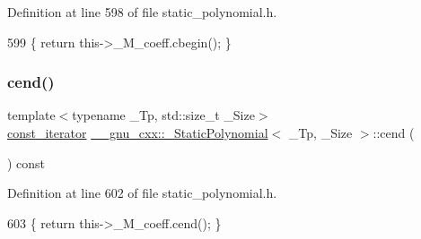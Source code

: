 Definition at line 598 of file static\+\_\+polynomial.\+h.


\begin{DoxyCode}
599       \{ \textcolor{keywordflow}{return} this->\_M\_coeff.cbegin(); \}
\end{DoxyCode}
\mbox{\label{class____gnu__cxx_1_1__StaticPolynomial_aa3cf8c243eaa80347ae1ba02897344e9}} 
\subsubsection{\texorpdfstring{cend()}{cend()}}
{\footnotesize\ttfamily template$<$typename \+\_\+\+Tp, std\+::size\+\_\+t \+\_\+\+Size$>$ \\
\hyperlink{class____gnu__cxx_1_1__StaticPolynomial_a2e806a3a61788a2fad49adf67725ae7e}{const\+\_\+iterator} \hyperlink{class____gnu__cxx_1_1__StaticPolynomial}{\+\_\+\+\_\+gnu\+\_\+cxx\+::\+\_\+\+Static\+Polynomial}$<$ \+\_\+\+Tp, \+\_\+\+Size $>$\+::cend (\begin{DoxyParamCaption}{ }\end{DoxyParamCaption}) const\hspace{0.3cm}{\ttfamily [inline]}}



Definition at line 602 of file static\+\_\+polynomial.\+h.


\begin{DoxyCode}
603       \{ \textcolor{keywordflow}{return} this->\_M\_coeff.cend(); \}
\end{DoxyCode}
\mbox{\label{class____gnu__cxx_1_1__StaticPolynomial_a74535a3f8f586223097b30891bc1402b}} 
